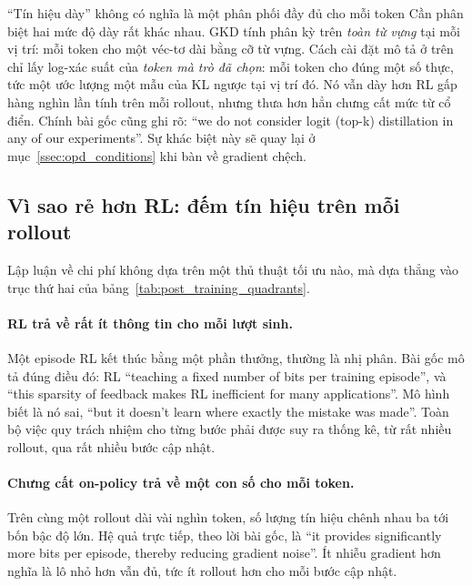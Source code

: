 \begin{pitfall}{``Tín hiệu dày'' không có nghĩa là một phân phối đầy đủ cho mỗi token}
Cần phân biệt hai mức độ dày rất khác nhau. GKD tính phân kỳ trên \emph{toàn từ vựng} tại mỗi vị trí: mỗi token cho một véc-tơ dài bằng cỡ từ vựng. Cách cài đặt mô tả ở trên chỉ lấy log-xác suất của \emph{token mà trò đã chọn}: mỗi token cho đúng một số thực, tức một ước lượng một mẫu của KL ngược tại vị trí đó. Nó vẫn dày hơn RL gấp hàng nghìn lần tính trên mỗi rollout, nhưng thưa hơn hẳn chưng cất mức từ cổ điển. Chính bài gốc cũng ghi rõ: ``we do not consider logit (top-k) distillation in any of our experiments''. Sự khác biệt này sẽ quay lại ở mục~\ref{ssec:opd_conditions} khi bàn về gradient chệch.
\end{pitfall}

\subsection{Vì sao rẻ hơn RL: đếm tín hiệu trên mỗi rollout}
\label{ssec:opd_vs_rl_cost}

Lập luận về chi phí không dựa trên một thủ thuật tối ưu nào, mà dựa thẳng vào trục thứ hai của bảng~\ref{tab:post_training_quadrants}.

\paragraph{RL trả về rất ít thông tin cho mỗi lượt sinh.} Một episode RL kết thúc bằng một phần thưởng, thường là nhị phân. Bài gốc mô tả đúng điều đó: RL ``teaching a fixed number of bits per training episode'', và ``this sparsity of feedback makes RL inefficient for many applications''. Mô hình biết là nó sai, ``but it doesn't learn where exactly the mistake was made''. Toàn bộ việc quy trách nhiệm cho từng bước phải được suy ra thống kê, từ rất nhiều rollout, qua rất nhiều bước cập nhật.

\paragraph{Chưng cất on-policy trả về một con số cho mỗi token.} Trên cùng một rollout dài vài nghìn token, số lượng tín hiệu chênh nhau ba tới bốn bậc độ lớn. Hệ quả trực tiếp, theo lời bài gốc, là ``it provides significantly more bits per episode, thereby reducing gradient noise''. Ít nhiễu gradient hơn nghĩa là lô nhỏ hơn vẫn đủ, tức ít rollout hơn cho mỗi bước cập nhật.

